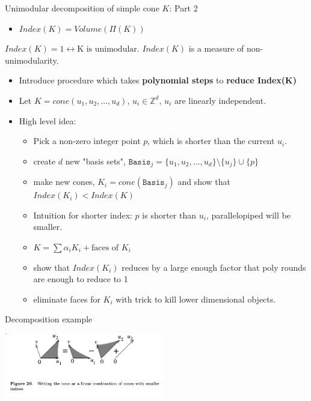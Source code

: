 \documentclass[8pt]{beamer}
\begin{document}
\begin{frame}[label=sec-14]{Unimodular decomposition of simple cone $K$: Part 2}
\begin{itemize}
\item $Index(K) = Volume(\Pi(K))$
\end{itemize}

$Index(K) = 1 \leftrightarrow \text{K is unimodular}$. $Index(K)$ is a measure of non-unimodularity.

\begin{itemize}
\item Introduce procedure which takes \textbf{polynomial steps} to \textbf{reduce Index(K)}
\item Let $K = cone(u_1, u_2, \ldots, u_d)$, $u_i \in \mathbb{Z}^d$, $u_i$ are linearly independent.
\item High level idea:
\begin{itemize}
\item Pick a non-zero integer point $p$, which is shorter than the current $u_i$.
\item create $d$ new "basis sets", $\texttt{Basis}_j = \{u_1, u_2 , \ldots, u_d\} \setminus \{u_j\} \cup \{p\}$
\item make new cones, $K_i = cone(\texttt{Basis}_j)$ and show that $Index(K_i) < Index(K)$
\item Intuition for shorter index: $p$ is shorter than $u_i$, parallelopiped will be smaller.
\item $K = \sum \alpha_i K_i + \text{faces of \(K_i \)}$
\item show that $Index(K_i)$ reduces by a large enough factor that poly rounds are enough to reduce to 1
\item eliminate faces for $K_i$ with trick to kill lower dimensional objects.
\end{itemize}
\end{itemize}
\end{frame}

\begin{frame}[label=sec-15]{Decomposition example}
\begin{center}
\includegraphics[width=7cm, keepaspectratio]{res/simple-cone-as-combination-smaller-indeces}
\end{center}
\end{frame}
\end{document}

